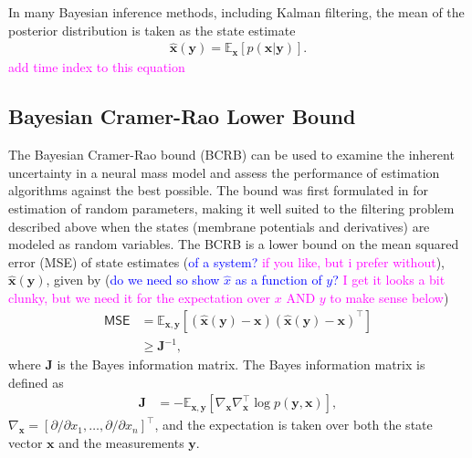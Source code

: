 \documentclass{article}
\renewcommand{\vec}[1]{\ensuremath{{\boldsymbol #1}}}
\newcommand{\unit}[1]{\textcolor{magenta}{#1}}
\newcommand{\brian}[1]{\textcolor{blue}{#1}}
\begin{document}
In many Bayesian inference methods, including Kalman filtering, the mean of the posterior distribution is taken as the state estimate
\begin{align}
	\hat{\mathbf{x}}\left(\mathbf{y}\right) = \mathbb{E}_\mathbf{x}\left[p\left(\mathbf{x}|\mathbf{y}\right)\right].
\end{align}
\unit{add time index to this equation}

\subsection{Bayesian Cramer-Rao Lower Bound}
The Bayesian Cramer-Rao bound (BCRB) can be used to examine the inherent uncertainty in a neural mass model and assess the  performance of estimation algorithms against the best possible. The bound was first formulated in \cite{VanTrees1968} for estimation of random parameters, making it well suited to the filtering problem described above when the states (membrane potentials and derivatives) are modeled as random variables. The BCRB is a lower bound on the mean squared error (MSE) of state estimates (\brian{of a system? }\unit{if you like, but i prefer without}), $\hat{\mathbf{x}}\left(\mathbf{y}\right)$, given by (\brian{do we need so show $\hat x$ as a function of $y$?} \unit{I get it looks a bit clunky, but we need it for the expectation over $x$ AND $y$ to make sense below})
\begin{align}
	\mathsf{MSE} &= \mathbb E_{\mathbf{x},\mathbf{y}} \left[\left(\hat{\mathbf{x}}\left(\mathbf{y}\right) - \mathbf{x}\right) \left(\hat{\mathbf{x}}\left(\mathbf{y}\right) - \mathbf{x}\right)^{\top}\right] \nonumber \\
	& \ge \mathbf{J}^{-1},
	\label{eqn:mse_bound}
\end{align}
where $\mathbf{J}$ is the Bayes information matrix. The Bayes information matrix is defined as
\begin{align}
	\mathbf{J} &= -\mathbb E_{\mathbf{x},\mathbf{y}}\left[ \nabla_{\mathbf{x}}\nabla_{\mathbf{x}}^{\top} \log p(\mathbf{y},\mathbf{x}) \right],
	\label{eqn:bayes_matrix}
\end{align}
$\nabla_{\mathbf{x}} = [\partial/\partial x_1,\ldots,\partial/\partial x_n]^{\top}$, and the expectation is taken over both the state vector $\mathbf{x}$ and the measurements $\mathbf{y}$. %
\end{document}
